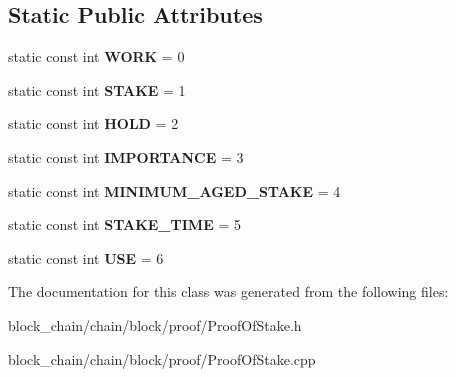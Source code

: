 \subsection*{Static Public Attributes}
\begin{DoxyCompactItemize}
\item 
\mbox{\label{classProof_a457d231986439ee6bcc945daacfc28fc}} 
static const int {\bfseries W\+O\+RK} = 0
\item 
\mbox{\label{classProof_acf157976c3c86ef2fd0e838b8c4ac992}} 
static const int {\bfseries S\+T\+A\+KE} = 1
\item 
\mbox{\label{classProof_ae5c2a86640bf558ff5625157e23b3eec}} 
static const int {\bfseries H\+O\+LD} = 2
\item 
\mbox{\label{classProof_a4e71a5e5928900794353acdd169ca652}} 
static const int {\bfseries I\+M\+P\+O\+R\+T\+A\+N\+CE} = 3
\item 
\mbox{\label{classProof_a1a08ffc465f4fcfde396d4c4feb22eb0}} 
static const int {\bfseries M\+I\+N\+I\+M\+U\+M\+\_\+\+A\+G\+E\+D\+\_\+\+S\+T\+A\+KE} = 4
\item 
\mbox{\label{classProof_a1aa2cb91c5be4ca021714ff6fc01da4a}} 
static const int {\bfseries S\+T\+A\+K\+E\+\_\+\+T\+I\+ME} = 5
\item 
\mbox{\label{classProof_a3f6898fa1d652d32182c3c387c8e979c}} 
static const int {\bfseries U\+SE} = 6
\end{DoxyCompactItemize}


The documentation for this class was generated from the following files\+:\begin{DoxyCompactItemize}
\item 
block\+\_\+chain/chain/block/proof/Proof\+Of\+Stake.\+h\item 
block\+\_\+chain/chain/block/proof/Proof\+Of\+Stake.\+cpp\end{DoxyCompactItemize}
